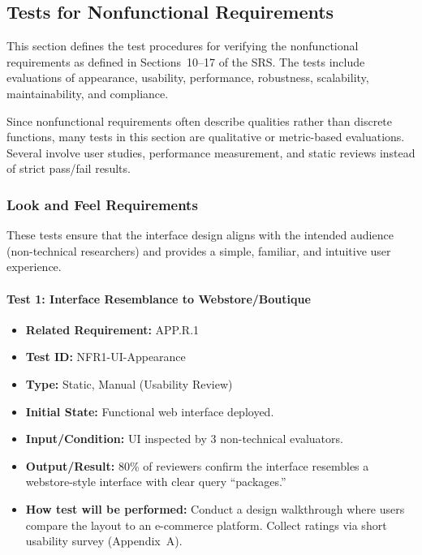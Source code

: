 \documentclass[12pt, titlepage]{article}
\begin{document}
\subsection{Tests for Nonfunctional Requirements}

This section defines the test procedures for verifying the nonfunctional
requirements as defined in Sections~10--17 of the SRS. The tests include
evaluations of appearance, usability, performance, robustness, scalability,
maintainability, and compliance. 

Since nonfunctional requirements often describe qualities rather than discrete
functions, many tests in this section are qualitative or metric-based
evaluations. Several involve user studies, performance measurement, and static
reviews instead of strict pass/fail results.

\subsubsection{Look and Feel Requirements}

These tests ensure that the interface design aligns with the intended audience
(non-technical researchers) and provides a simple, familiar, and intuitive
user experience.

\paragraph{Test 1: Interface Resemblance to Webstore/Boutique}
\begin{itemize}
    \item \textbf{Related Requirement:} APP.R.1
    \item \textbf{Test ID:} NFR1-UI-Appearance
    \item \textbf{Type:} Static, Manual (Usability Review)
    \item \textbf{Initial State:} Functional web interface deployed.
    \item \textbf{Input/Condition:} UI inspected by 3 non-technical evaluators.
    \item \textbf{Output/Result:} 80\% of reviewers confirm the interface resembles a webstore-style interface with clear query “packages.”
    \item \textbf{How test will be performed:} Conduct a design walkthrough where users compare the layout to an e-commerce platform. Collect ratings via short usability survey (Appendix~A).
\end{itemize}
\end{document}

